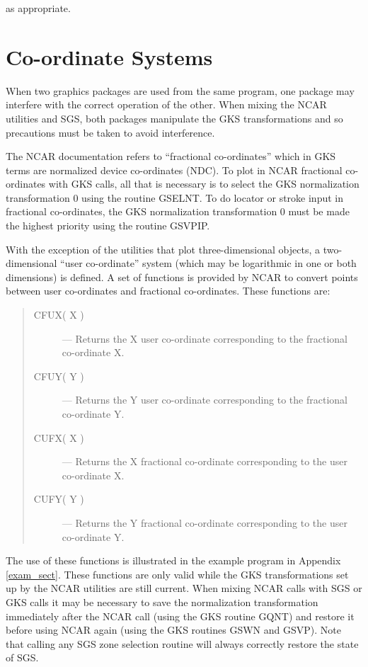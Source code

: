\documentclass[twoside,11pt]{article}
\newcommand{\xlabel}[1]{}
\renewcommand{\_}{\texttt{\symbol{95}}}
\begin{document}
as appropriate.


\section{\xlabel{coordinate_systems_labelcoord_sect}Co-ordinate Systems}
\label{co-ord_sect}

When two graphics packages are used from the same program, one package may
interfere with the correct operation of the other. 
When mixing the NCAR
utilities and SGS, both packages manipulate the GKS transformations and
so precautions must be taken to avoid interference.

The NCAR documentation refers to ``fractional co-ordinates'' which in
GKS terms are normalized device co-ordinates (NDC). 
To plot in NCAR fractional co-ordinates with GKS calls, all that is 
necessary is to select the GKS normalization transformation 0 using the 
routine GSELNT. 
To do locator or stroke input in fractional co-ordinates, the GKS normalization 
transformation 0 must be made the highest priority using the routine 
GSVPIP.

With the exception of the utilities that plot three-dimensional objects, a 
two-dimensional ``user co-ordinate'' system (which may be logarithmic in one or
both dimensions) is defined. 
A set of functions is provided by NCAR to convert points between user
co-ordinates and fractional co-ordinates.
These functions are:

\begin{quote}
\begin{description}
\item [CFUX( X )] ---
 Returns the X user co-ordinate corresponding to the fractional co-ordinate X.
\item [CFUY( Y )] ---
 Returns the Y user co-ordinate corresponding to the fractional co-ordinate Y.
\item [CUFX( X )] ---
 Returns the X fractional co-ordinate corresponding to the user co-ordinate X.
\item [CUFY( Y )] ---
 Returns the Y fractional co-ordinate corresponding to the user co-ordinate Y.
\end{description}
\end{quote}

The use of these functions is illustrated in the example program in Appendix 
\ref{exam_sect}.
These functions are only valid while the GKS transformations set up by the NCAR
utilities are still current.
When mixing NCAR calls with SGS or GKS calls it may be necessary to save the
normalization transformation immediately after the NCAR call (using the GKS
routine GQNT) and restore it before using NCAR again (using the GKS routines 
GSWN and GSVP).
Note that calling any SGS zone selection routine will always correctly restore
the state of SGS.
\end{document}
